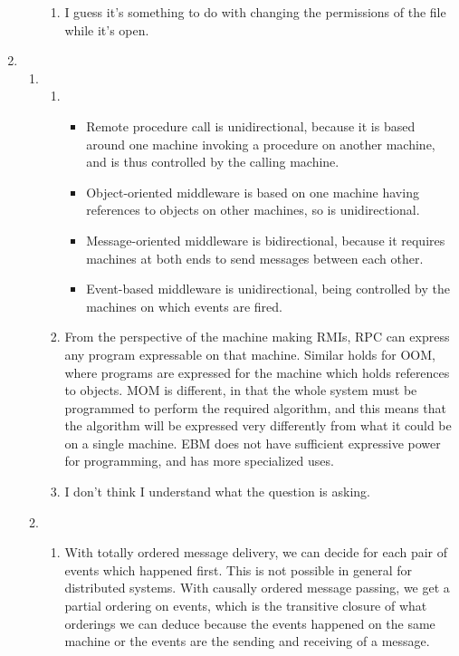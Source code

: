 \documentclass{article}
\begin{document}
\begin{enumerate}
\begin{enumerate}
\begin{enumerate}
          \item I guess it's something to do with changing the permissions of the file while it's open.
        \end{enumerate}
    \end{enumerate}
  \item
    \begin{enumerate}
      \item
        \begin{enumerate}
          \item
            \begin{itemize}
              \item Remote procedure call is unidirectional, because it is based around one machine invoking a procedure on another machine, and is thus controlled by the calling machine.
              \item Object-oriented middleware is based on one machine having references to objects on other machines, so is unidirectional.
              \item Message-oriented middleware is bidirectional, because it requires machines at both ends to send messages between each other.
              \item Event-based middleware is unidirectional, being controlled by the machines on which events are fired.
            \end{itemize}
          \item From the perspective of the machine making RMIs, RPC can express any program expressable on that machine. Similar holds for OOM, where programs are expressed for the machine which holds references to objects. MOM is different, in that the whole system must be programmed to perform the required algorithm, and this means that the algorithm will be expressed very differently from what it could be on a single machine. EBM does not have sufficient expressive power for programming, and has more specialized uses.
          \item I don't think I understand what the question is asking.
        \end{enumerate}
      \item
        \begin{enumerate}
          \item With totally ordered message delivery, we can decide for each pair of events which happened first. This is not possible in general for distributed systems. With causally ordered message passing, we get a partial ordering on events, which is the transitive closure of what orderings we can deduce because the events happened on the same machine or the events are the sending and receiving of a message.

\end{enumerate}
\end{enumerate}
\end{enumerate}
\end{document}
